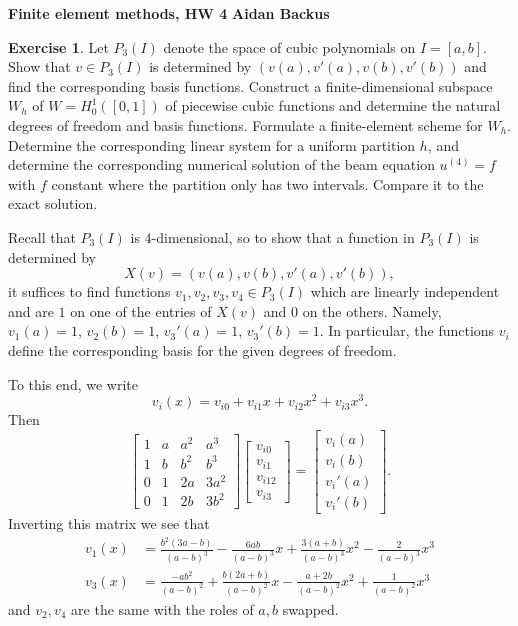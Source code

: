 \documentclass[10pt]{article}
\theoremstyle{definition}
\newtheorem{exer}{Exercise}
\begin{document}
\noindent
\large\textbf{Finite element methods, HW 4} \hfill \textbf{Aidan Backus} \\

\begin{exer}
Let $P_3(I)$ denote the space of cubic polynomials on $I = [a, b]$.
Show that $v \in P_3(I)$ is determined by $(v(a), v'(a), v(b), v'(b))$ and find the corresponding basis functions.
Construct a finite-dimensional subspace $W_h$ of $W = H^1_0([0, 1])$ of piecewise cubic functions and determine the natural degrees of freedom and basis functions.
Formulate a finite-element scheme for $W_h$.
Determine the corresponding linear system for a uniform partition $h$, and determine the corresponding numerical solution of the beam equation $u^{(4)} = f$ with $f$ constant where the partition only has two intervals.
Compare it to the exact solution.
\end{exer}

Recall that $P_3(I)$ is $4$-dimensional, so to show that a function in $P_3(I)$ is determined by
$$X(v) = (v(a), v(b), v'(a), v'(b)),$$
it suffices to find functions $v_1, v_2, v_3, v_4 \in P_3(I)$ which are linearly independent and are $1$ on one of the entries of $X(v)$ and $0$ on the others. Namely, $v_1(a) = 1$, $v_2(b) = 1$, $v_3'(a) = 1$, $v_3'(b) = 1$.
In particular, the functions $v_i$ define the corresponding basis for the given degrees of freedom.

To this end, we write
$$v_i(x) = v_{i0} + v_{i1}x + v_{i2}x^2 + v_{i3}x^3.$$
Then
$$\begin{bmatrix} 1 & a & a^2 & a^3 \\ 1 & b & b^2 & b^3 \\ 0 & 1 & 2a & 3a^2 \\ 0 & 1 & 2b & 3b^2 \end{bmatrix}\begin{bmatrix}v_{i0} \\ v_{i1} \\ v_{i12} \\ v_{i3}\end{bmatrix} = \begin{bmatrix}v_i(a) \\ v_i(b) \\ v_i'(a) \\ v_i'(b)\end{bmatrix}.$$
Inverting this matrix we see that
\begin{align*}
    v_1(x) &= \frac{b^2(3a - b)}{(a - b)^3} - \frac{6ab}{(a - b)^3}x + \frac{3(a + b)}{(a - b)^3}x^2 - \frac{2}{(a - b)^3}x^3\\
    v_3(x) &= \frac{-ab^2}{(a - b)^2} + \frac{b(2a + b)}{(a - b)^2}x - \frac{a + 2b}{(a - b)^2}x^2 + \frac{1}{(a - b)^2}x^3
\end{align*}
and $v_2,v_4$ are the same with the roles of $a,b$ swapped.
\end{document}
